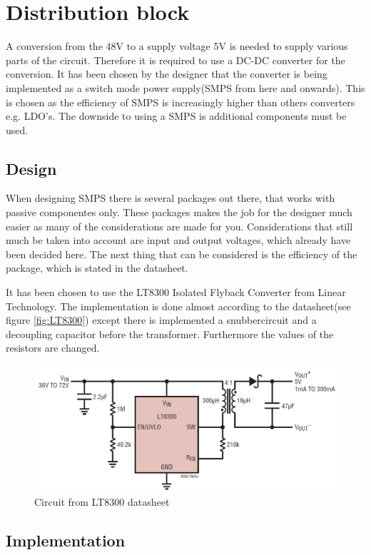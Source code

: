 \section{Distribution block}
\label{sec:SMPS}
A conversion from the 48V to a supply voltage 5V is needed to supply various parts of the circuit. Therefore it is required to use a DC-DC converter for the conversion. It has been chosen by the designer that the converter is being implemented as a switch mode power supply(SMPS from here and onwards). This is chosen as the efficiency of SMPS is increasingly higher than others converters e.g. LDO's. The downside to using a SMPS is additional components must be used.  

\subsection{Design}

When designing SMPS there is several packages out there, that works with passive componentes only. These packages makes the job for the designer much easier as many of the considerations are made for you. Considerations that still much be taken into account are input and output voltages, which already have been decided here. The next thing that can be considered is the efficiency of the package, which is stated in the datasheet.

It has been chosen to use the LT8300 Isolated Flyback Converter from Linear Technology. The implementation is done almost according to the datasheet(see figure \vref{fig:LT8300}) \cite{LT8300} except there is implemented a snubbercircuit and a decoupling capacitor before the transformer. Furthermore the values of the resistors are changed.  \\

\begin{figure}[H]
	\centering
	\includegraphics[width=0.6\linewidth]{Hardware/Pictures/LT8300_circuit}
	\caption{Circuit from LT8300 datasheet}
	\label{fig:LT8300}
\end{figure}

\subsection{Implementation}

